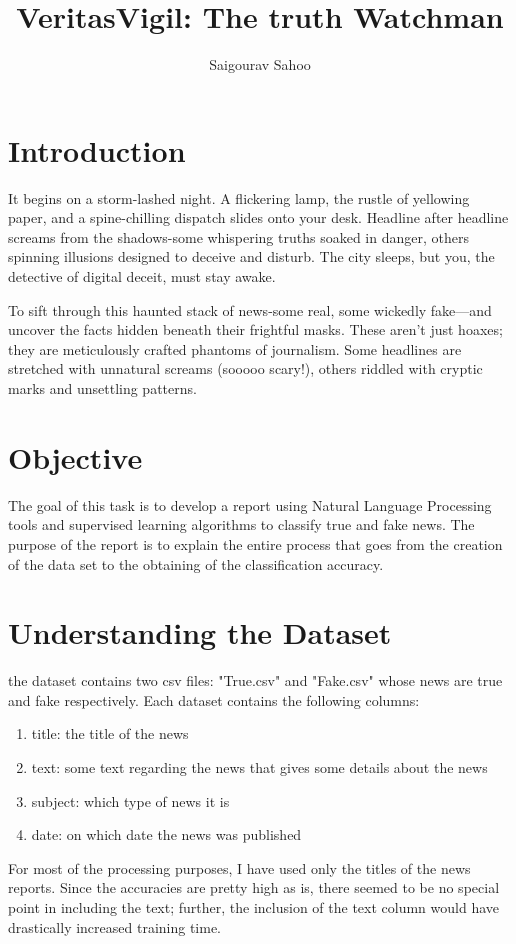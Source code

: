 \documentclass{article}
\title{VeritasVigil: The truth Watchman}
\author{Saigourav Sahoo}
\begin{document}
\maketitle

\section{Introduction}
It begins on a storm-lashed night. A flickering lamp, the rustle of yellowing paper, and a spine-chilling dispatch slides onto your desk. Headline after headline screams from the shadows-some whispering truths soaked in danger, others spinning illusions designed to deceive and disturb. The city sleeps, but you, the detective of digital deceit, must stay awake.

To sift through this haunted stack of news-some real, some wickedly fake—and uncover the facts hidden beneath their frightful masks. These aren't just hoaxes; they are meticulously crafted phantoms of journalism. Some headlines are stretched with unnatural screams (sooooo scary!), others riddled with cryptic marks and unsettling patterns.

\section{Objective}
The goal of this task is to develop a report using Natural Language Processing tools and supervised learning algorithms to classify true and fake news. The purpose of the report is to explain the entire process that goes from the creation of the data set to the obtaining of the classification accuracy.

\section{Understanding the Dataset}
the dataset contains two csv files: "True.csv" and "Fake.csv" whose news are true and fake respectively. Each dataset contains the following columns:
\begin{enumerate}
    \item title: the title of the news
    \item text: some text regarding the news that gives some details about the news
    \item subject: which type of news it is 
    \item date: on which date the news was published
\end{enumerate}

For most of the processing purposes, I have used only the titles of the news reports. Since the accuracies are pretty high as is, there seemed to be no special point in including the text; further, the inclusion of the text column would have drastically increased training time.
\end{document}
